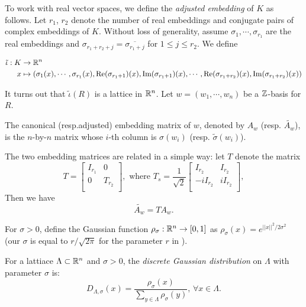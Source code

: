 \documentclass{amsart}
\begin{document}
To work with real vector spaces, we define the {\it adjusted embedding} of $K$ as follows. Let $r_1$, $r_2$ denote the number of real embeddings and conjugate pairs of complex embeddings of $K$. Without loss of generality, assume $\sigma_1, \cdots, \sigma_{r_1}$ are the real embeddings and $\sigma_{r_1+r_2+j} = \overline{\sigma_{r_1 + j}}$ for $1 \leq j \leq r_2$. We define

\begin{align*}
    \tilde{\iota}: K & \to \mathbb{R}^n \\
    x & \mapsto (\sigma_1(x), \cdots, \sigma_{r_1}(x), \Re(\sigma_{r_1+1})(x), \Im(\sigma_{r_1+1})(x), \cdots,  \Re(\sigma_{r_1+r_2})(x), \Im(\sigma_{r_1+r_2})(x))
\end{align*}

It turns out that $\tilde{\iota}(R)$ is a lattice in $\mathbb{R}^n$. Let $w = (w_1, \cdots , w_n)$ be a $\mathbb{Z}$-basis for $R$.

\begin{Definition}
The canonical (resp.adjusted) embedding matrix of $w$, denoted by $A_w$ (resp. $\tilde{A_w}$), is the $n$-by-$n$ matrix whose $i$-th column is $\sigma(w_i)$ (resp. $\tilde{\sigma}(w_i)$).
\end{Definition}

The two embedding matrices are related in a simple way:
let $T$ denote the matrix
\[
T = \begin{bmatrix}
    I_{r_1}  & 0  \\
    0     & T_{r_2} \\
\end{bmatrix},
\mbox{ where } T_s = \frac{1}{\sqrt{2}} \begin{bmatrix}
    I_{r_2}  & I_{r_2} \\
    -iI_{r_2}     & iI_{r_2} \\
\end{bmatrix},
\]
Then we have
$$\tilde{A_{w}} = T A_{w}.$$


For $\sigma > 0$, define the Gaussian function $\rho_\sigma: \mathbb{R}^n \to [0,1]$ as $\rho_\sigma(x) = e^{||x||^2/2\sigma^2}$ (our $\sigma$ is equal to $r/\sqrt{2\pi}$ for the parameter $r$ in \cite{lyubashevsky2013ideal}).
\begin{Definition}
For a lattiace $\Lambda \subset \mathbb{R}^n$ and $\sigma > 0$, the {\it discrete Gaussian distribution} on $\Lambda$ with parameter $\sigma$ is:
\[
    D_{\Lambda, \sigma}(x) = \frac{\rho_\sigma(x)}{\sum_{y \in\Lambda} \rho_\sigma(y)}, \, \forall x \in \Lambda.
\]

\end{Definition}
\end{document}
